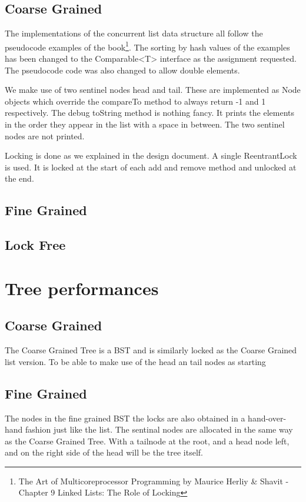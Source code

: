 \documentclass[10pt,a4paper]{article}
\begin{document}
\subsection{Coarse Grained}
The implementations of the concurrent list data structure all follow the pseudocode examples of the book\footnote{The Art of Multicoreprocessor Programming by Maurice Herliy \& Shavit - Chapter 9 Linked Lists: The Role of Locking}. The sorting by hash values of the examples has been changed to the Comparable<T> interface as the assignment requested. The pseudocode code was also changed to allow double elements.

We make use of two sentinel nodes head and tail. These are implemented as Node objects which override the compareTo method to always return -1 and 1 respectively. The debug toString method is nothing fancy. It prints the elements in the order they appear in the list with a space in between. The two sentinel nodes are not printed.

Locking is done as we explained in the design document. A single ReentrantLock is used. It is locked at the start of each add and remove method and unlocked at the end.

\subsection{Fine Grained}

\subsection{Lock Free}

\section{Tree performances}
\subsection{Coarse Grained}
The Coarse Grained Tree is a BST and is similarly locked as the Coarse Grained list version. To be able to make use of the head an tail nodes as starting 
\subsection{Fine Grained}
The nodes in the fine grained BST the locks are also obtained in a hand-over-hand fashion just like the list. The sentinal nodes are allocated in the same way as the Coarse Grained Tree. With a tailnode at the root, and a head node left, and on the right side of the head will be the tree itself. 
\end{document}
